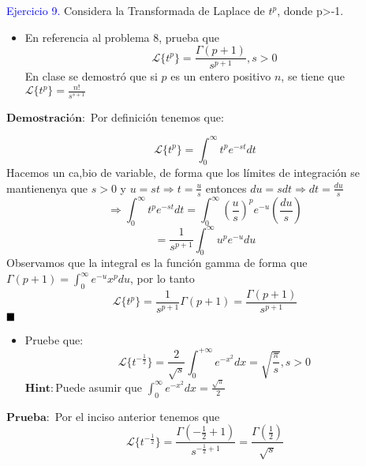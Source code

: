 \textcolor{blue}{Ejercicio 9.} Considera la Transformada de Laplace de $t^{p}$, donde p>-1.
\begin{itemize}
    \item En referencia al problema 8, prueba que
    \begin{equation}
        \mathscr{L}\{t^{p}\}=\frac{\Gamma(p+1)}{s^{p+1}}, s>0
        \label{eq:ejer9}
    \end{equation}
    En clase se demostró que si $p$ es un entero positivo $n$, se tiene que $\mathscr{L}\{t^{p}\}=\frac{n!}{s^{s+1}}$
\end{itemize}
$\mathbf{Demostración:}$ Por definición tenemos que:

\begin{equation*}
     \mathscr{L}\{t^{p}\}= \int_{0}^{\infty}t^{p}e^{-st}dt
\end{equation*}
Hacemos un ca,bio de variable, de forma que los límites de integración se mantienenya que $s>0$ y $u=st \Rightarrow t=\frac{u}{s}$ entonces $du=s dt \Rightarrow dt=\frac{du}{s}$ 
\begin{equation*}
      \Rightarrow \int_{0}^{\infty}t^{p}e^{-st}dt= \int_{0}^{\infty}(\frac{u}{s})^{p}e^{-u} (\frac{du}{s})
\end{equation*}
\begin{equation*}
        =\frac{1}{s^{p+1}}\int_{0}^{\infty}u^{p}e^{-u} du
\end{equation*}
Observamos que la integral es la función gamma de forma que $\Gamma (p+1)= \int_{0}^{\infty} e^{-u} x^{p} du$, por lo tanto
\begin{equation}
   \mathscr{L}\{t^{p}\} =\frac{1}{s^{p+1}}\Gamma (p+1)=\frac{\Gamma (p+1)}{s^{p+1}}
\end{equation}
$\hfill \blacksquare$
\begin{itemize}
    \item Pruebe que:
    \begin{equation}
        \mathscr{L}\{t^{-\frac{1}{2}}\}=\frac{2}{\sqrt{s}}\int_{0}^{+\infty}e^{-x^{2}}dx=\sqrt{\frac{\pi}{s}},   s>0
    \end{equation}
  $\mathbf{Hint:}$Puede asumir que $\int_{0}^{\infty}e^{-x^{2}}dx = \frac{\sqrt{\pi}}{2}$ 
\end{itemize}
$\mathbf{Prueba:}$ Por el inciso anterior tenemos que
\begin{equation}
    \mathscr{L}\{t^{-\frac{1}{2}}\}=\frac{\Gamma(-\frac{1}{2}+1)}{s^{-\frac{1}{2}+1}}=
    \frac{\Gamma(\frac{1}{2})}{\sqrt{s}}
    \label{eq:trans}
\end{equation}
